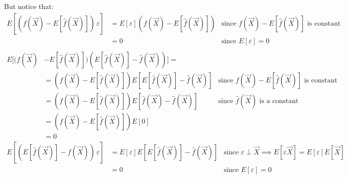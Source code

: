     But notice that:
    \begin{align*}
      E[(f(\vec{X}) - E[\hat{f}(\vec{X})])\,\varepsilon] 
      & = E[\varepsilon](f(\vec{X}) - E[\hat{f}(\vec{X})]) 
      & \text{since } f(\vec{X}) - E[\hat{f}(\vec{X})] \text{ is constant}\\
      & = 0
      & \text{since } E[\varepsilon] = 0 \\
    \end{align*}
    \begin{align*}
      E[(f(\vec{X}) & - E[\hat{f}(\vec{X})])(E[\hat{f}(\vec{X})] - \hat{f}(\vec{X}))] = \\
                    & = (f(\vec{X}) - E[\hat{f}(\vec{X})])E[E[\hat{f}(\vec{X})] - \hat{f}(\vec{X})]
                    & \text{since } f(\vec{X}) - E[\hat{f}(\vec{X})] \text{ is constant} \\
                    & = (f(\vec{X}) - E[\hat{f}(\vec{X})])E[ \hat{f}(\vec{X}) - \hat{f}(\vec{X})]
                    & \text{since } \hat{f}(\vec{X}) \text{ is a constant} \\
                    & = (f(\vec{X}) - E[\hat{f}(\vec{X})])E[0] \\
                    & = 0
    \end{align*}
    \begin{align*}
      E[(E[\hat{f}(\vec{X})] - \hat{f}(\vec{X}))\,\varepsilon]
      & = E[\varepsilon]E[E[\hat{f}(\vec{X})] - \hat{f}(\vec{X})]
      & \text{since } \varepsilon \perp \vec{X} \implies E[\varepsilon\vec{X}] = E[\varepsilon]E[\vec{X}]\\
      & = 0
      & \text{since } E[\varepsilon] = 0 \\
    \end{align*}
    
